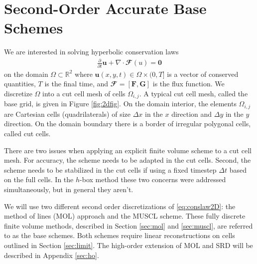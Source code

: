 \section{Second-Order Accurate Base Schemes}\label{sec:basefv}
We are interested in solving hyperbolic conservation laws 
\begin{equation}
\begin{aligned} \label{eq:conslaw2D}
\frac{\partial}{\partial t}	\mathbf{u} + \nabla \cdot \mathbfcal{F}(u)  = \mathbf{0}
\end{aligned}
\end{equation}
on the domain $\Omega \subset \mathbb{R}^2$ where $\mathbf{u}(x,y,t) \in \Omega \times (0,T]$ is a vector of conserved quantities, $T$ is the final time, and $\mathbfcal{F} = [\mathbf{F}, \mathbf{G}]$ is the flux function.  We discretize $\Omega$ into a cut cell mesh of cells $\Omega_{i,j}$.  A typical cut cell mesh, called the base grid, is given in Figure \ref{fig:2dfig}.  On the domain interior, the elements $\Omega_{i,j}$ are Cartesian cells (quadrilaterals) of size $\Delta x$ in the $x$ direction and $\Delta y$ in the $y$ direction.  On the domain boundary there is a border of irregular polygonal cells, called cut cells.  



There are two issues when applying an explicit finite volume scheme to a cut cell
mesh.  For accuracy, the scheme needs to be adapted in the cut cells. Second, 
the scheme needs to be stabilized in the cut cells if using a fixed timestep $\Delta t$ 
based on the full cells. In the $h$-box method these two concerns were addressed
simultaneously, but in general they aren't.

We will use two different second order discretizations of \eqref{eq:conslaw2D}: the method of lines
(MOL) approach and the MUSCL scheme.
These fully discrete finite volume methods, described in Section \ref{sec:mol} and \ref{sec:muscl},
are referred to as the base schemes.  Both schemes require linear 
reconstructions on cells 
outlined in Section \ref{sec:limit}.  The high-order extension of MOL and SRD  will be described 
in Appendix \ref{sec:ho}. 

